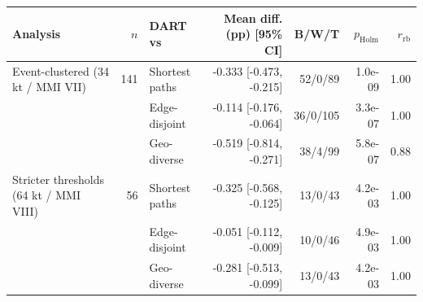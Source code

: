 \begin{tabular}{lrlrrrr}
\toprule
Analysis & $n$ & DART vs & Mean diff. (pp) [95\% CI] & B/W/T & $p_{\mathrm{Holm}}$ & $r_{\mathrm{rb}}$ \\
\midrule
Event-clustered (34 kt / MMI VII) & 141 & Shortest paths & -0.333 [-0.473, -0.215] & 52/0/89 & 1.0e-09 & 1.00 \\
 &  & Edge-disjoint & -0.114 [-0.176, -0.064] & 36/0/105 & 3.3e-07 & 1.00 \\
 &  & Geo-diverse & -0.519 [-0.814, -0.271] & 38/4/99 & 5.8e-07 & 0.88 \\
\addlinespace
Stricter thresholds (64 kt / MMI VIII) & 56 & Shortest paths & -0.325 [-0.568, -0.125] & 13/0/43 & 4.2e-03 & 1.00 \\
 &  & Edge-disjoint & -0.051 [-0.112, -0.009] & 10/0/46 & 4.9e-03 & 1.00 \\
 &  & Geo-diverse & -0.281 [-0.513, -0.099] & 13/0/43 & 4.2e-03 & 1.00 \\
\bottomrule
\end{tabular}
